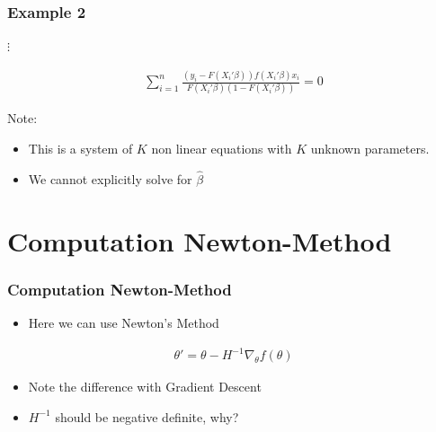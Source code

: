 \documentclass[
  shownotes,
  xcolor={svgnames},
  hyperref={colorlinks,citecolor=DarkBlue,linkcolor=DarkRed,urlcolor=DarkBlue}
  , aspectratio=169]{beamer}
\begin{document}
\begin{frame}[fragile]
\frametitle{Example 2}
\begin{centering}
$\vdots$
\end{centering}

\begin{align}
\sum_{i=1}^n\frac{(y_i-F(X_{i}'\beta))f(X_{i}'\beta)x_i}{F(X_{i}'\beta)(1-F(X_{i}'\beta))}=0
\end{align}

\bigskip
Note:
\begin{itemize}
  \item This is a system of $K$ non linear equations with $K$ unknown parameters. 
  \item We cannot explicitly solve for $\hat \beta$
\end{itemize}


\end{frame}
\section{Computation Newton-Method}

\begin{frame}[fragile]
\frametitle{Computation Newton-Method}
\begin{itemize}
\item Here we can use Newton’s Method 
\end{itemize}
\bigskip
\begin{align}
    \theta'=\theta-H^{-1} \nabla_\theta f(\theta)
    \end{align}
\bigskip
\begin{itemize}
  \item Note the difference with Gradient Descent
  \medskip
  \item $H^{-1}$ should be negative definite, why? 
\end{itemize}

\end{frame}
\end{document}
